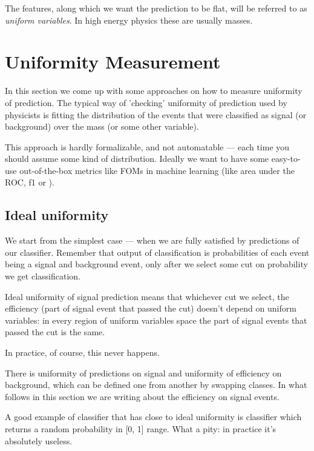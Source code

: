 \documentclass[12pt]{article}
\theoremstyle{definition}
\theoremstyle{remark}
\begin{document}
The features, along which we want the prediction to be flat, will be referred to as 
\textit{uniform variables}. In high energy physics these are usually masses.

\section{Uniformity Measurement}

In this section we come up with some approaches on how to measure uniformity of prediction. The typical way of 'checking' uniformity of prediction used by physicists 
is fitting the distribution of the events that were classified as signal (or background) over the mass (or some other variable).

This approach is hardly formalizable, and not automatable --- each time you should assume some kind of distribution. 
Ideally we want to have some easy-to-use out-of-the-box metrics like FOMs in machine learning (like area under the ROC, f1 or ).

\subsection{Ideal uniformity}

We start from the simplest case --- when we are fully satisfied by predictions of our classifier. Remember that output of 
classification is probabilities of each event being a signal and background event, only after we select some cut on probability we get classification.

Ideal uniformity of signal prediction means that whichever cut we select, the efficiency (part of signal event that passed the cut) doesn't depend on uniform variables: 
in every region of uniform variables space the part of signal events that passed the cut is the same.

In practice, of course, this never happens.

There is uniformity of predictions on signal and uniformity of efficiency on background, which can be defined one from another by swapping classes. 
In what follows in this section we are writing about the efficiency on signal events.

A good example of classifier that has close to ideal uniformity is classifier which returns a random probability in [0, 1] range. What a pity: in practice it's absolutely useless.

\end{document}
